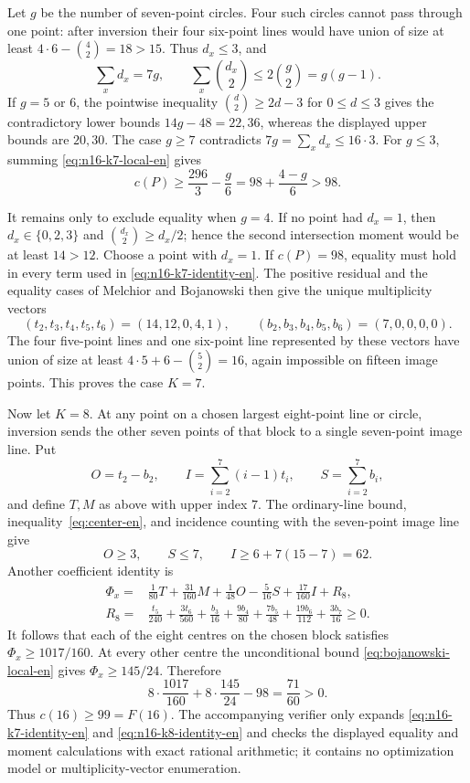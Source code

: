 \documentclass[11pt,a4paper]{article}
\theoremstyle{definition}
\begin{document}
Let \(g\) be the number of seven-point circles.  Four such circles cannot
pass through one point: after inversion their four six-point lines would have
union of size at least \(4\cdot6-\binom42=18>15\).  Thus \(d_x\le3\), and
\[
 \sum_xd_x=7g,\qquad
 \sum_x\binom{d_x}{2}\le2\binom g2=g(g-1).
\]
If \(g=5\) or \(6\), the pointwise inequality
\(\binom d2\ge2d-3\) for \(0\le d\le3\) gives the contradictory lower bounds
\(14g-48=22,36\), whereas the displayed upper bounds are \(20,30\).
The case \(g\ge7\) contradicts \(7g=\sum_xd_x\le16\cdot3\).
For \(g\le3\), summing \eqref{eq:n16-k7-local-en} gives
\[
 c(P)\ge\frac{296}{3}-\frac g6
       =98+\frac{4-g}{6}>98.
\]

It remains only to exclude equality when \(g=4\).  If no point had
\(d_x=1\), then \(d_x\in\{0,2,3\}\) and
\(\binom{d_x}{2}\ge d_x/2\); hence the second intersection moment would be
at least \(14>12\).  Choose a point with \(d_x=1\).  If \(c(P)=98\), equality
must hold in every term used in \eqref{eq:n16-k7-identity-en}.  The positive
residual and the equality cases of Melchior and Bojanowski then give the unique
multiplicity vectors
\[
 (t_2,t_3,t_4,t_5,t_6)=(14,12,0,4,1),\qquad
 (b_2,b_3,b_4,b_5,b_6)=(7,0,0,0,0).
\]
The four five-point lines and one six-point line represented by these vectors have union of
size at least \(4\cdot5+6-\binom52=16\), again impossible on fifteen image
points.  This proves the case \(K=7\).

Now let \(K=8\).  At any point on a chosen largest eight-point line or circle,
inversion sends the other seven points of that block to a single seven-point
image line.  Put
\[
 O=t_2-b_2,\qquad I=\sum_{i=2}^7(i-1)t_i,\qquad
 S=\sum_{i=2}^7b_i,
\]
and define \(T,M\) as above with upper index \(7\).  The ordinary-line bound,
inequality~\eqref{eq:center-en}, and incidence counting with the seven-point
image line give
\[
 O\ge3,\qquad S\le7,\qquad I\ge6+7(15-7)=62.
\]
Another coefficient identity is
\begin{equation}\label{eq:n16-k8-identity-en}
\begin{split}
 \Phi_x={}&\frac1{80}T+\frac{31}{160}M+\frac1{48}O
        -\frac5{16}S+\frac{17}{160}I+R_8,\\
 R_8={}&\frac{t_5}{240}+\frac{3t_6}{560}+\frac{b_3}{16}
 +\frac{9b_4}{80}+\frac{7b_5}{48}+\frac{19b_6}{112}
 +\frac{3b_7}{16}\ge0.
\end{split}
\end{equation}
It follows that each of the eight centres on the chosen block satisfies
\(\Phi_x\ge1017/160\).  At every other centre the unconditional bound
\eqref{eq:bojanowski-local-en} gives \(\Phi_x\ge145/24\).  Therefore
\[
 8\cdot\frac{1017}{160}+8\cdot\frac{145}{24}-98=\frac{71}{60}>0.
\]
Thus \(c(16)\ge99=F(16)\).  The accompanying verifier only expands
\eqref{eq:n16-k7-identity-en} and \eqref{eq:n16-k8-identity-en} and checks the
displayed equality and moment calculations with exact rational arithmetic;
it contains no optimization model or multiplicity-vector enumeration.
\end{document}
